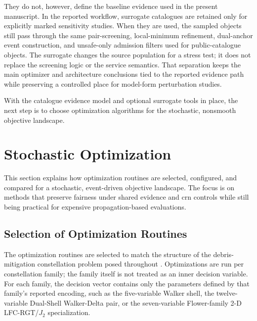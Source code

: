     They do not, however, define the baseline evidence used in the present manuscript. In the reported workflow, surrogate catalogues are retained only for explicitly marked sensitivity studies. When they are used, the sampled objects still pass through the same pair-screening, local-minimum refinement, dual-anchor event construction, and unsafe-only admission filters used for public-catalogue objects. The surrogate changes the source population for a stress test; it does not replace the screening logic or the service semantics. That separation keeps the main optimizer and architecture conclusions tied to the reported evidence path while preserving a controlled place for model-form perturbation studies.

    With the catalogue evidence model and optional surrogate tools in place, the next step is to choose optimization algorithms for the stochastic, nonsmooth objective landscape.

    \section{Stochastic Optimization} \label{se:optimalgos}
    This section explains how optimization routines are selected, configured, and compared for a stochastic, event-driven objective landscape. The focus is on methods that preserve fairness under shared evidence and \gls{crn} controls while still being practical for expensive propagation-based evaluations.

        \subsection{Selection of Optimization Routines}

        The optimization routines are selected to match the structure of the debris-mitigation constellation problem posed throughout . Optimizations are run per constellation family; the family itself is not treated as an inner decision variable. For each family, the decision vector contains only the parameters defined by that family's reported encoding, such as the five-variable Walker shell, the twelve-variable Dual-Shell Walker-Delta pair, or the seven-variable Flower-family 2-D LFC-RGT/\(J_2\) specialization.

